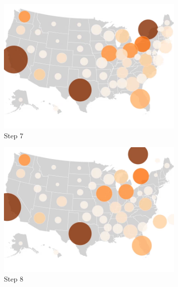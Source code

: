 \begin{figure}[!htb]
    \begin{subfigure}[b]{0.31\textwidth}
        \centering
        \includegraphics[width=\textwidth]{images/results/dot_cartogram/transition_7.png}
        \caption[]%
        {{\small Step 7}}
    \end{subfigure}
    \hfill
    \begin{subfigure}[b]{0.31\textwidth}
        \centering
        \includegraphics[width=\textwidth]{images/results/dot_cartogram/transition_8.png}
        \caption[]%
        {{\small Step 8}}
    \end{subfigure}
    \hfill
    \begin{subfigure}[b]{0.31\textwidth}
        \centering

\end{subfigure}
\end{figure}
